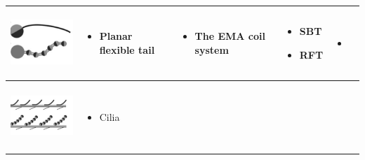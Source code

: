 \documentclass[12pt,a4paper,titlepage]{report}
\begin{document}
\begin{table}[h!]
\begin{tabular}{ c m{2.5cm}  m{4.3cm} m{3cm} m{2cm}}
\begin{minipage}{.3\textwidth}
      \includegraphics[width=\linewidth, height=25mm]{Planar_flexible_tail}
    \end{minipage}
    &
    \begin{minipage}[t]{3cm}
      \begin{itemize}
        \item Planar flexible tail
     
      \end{itemize}
    \end{minipage}
    & 
    \begin{minipage}[t]{4cm}
      \begin{itemize}
        \item The EMA coil system
     
      \end{itemize}
    \end{minipage}
 &
  \begin{minipage}[t]{3cm}
      \begin{itemize}
        \item SBT
	\item RFT
     
      \end{itemize}
    \end{minipage}

	&
	   \begin{itemize}
        \item \citep{kim2013fabrication}
   
      \end{itemize}
    \\ \hline


\begin{minipage}{.3\textwidth}
      \includegraphics[width=\linewidth, height=25mm]{cilia-shape}
    \end{minipage}
    &
    \begin{minipage}[t]{3cm}
      \begin{itemize}
        \item Cilia
     

\end{itemize}
\end{minipage}
\end{tabular}
\end{table}
\end{document}
